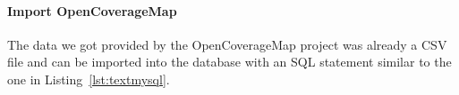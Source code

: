 \documentclass[master,english]{hgbthesis}
\begin{document}
\paragraph{Import OpenCoverageMap}
The data we got provided by the OpenCoverageMap project was already a CSV file and can be imported into the database with an SQL statement similar to the one in Listing~\ref{lst:textmysql}.
\end{document}
